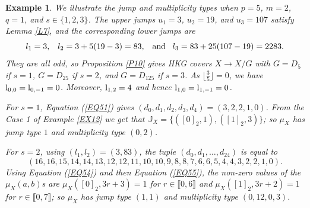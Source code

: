 \documentclass[11pt]{amsart}
\newtheorem{ex}[theorem]{Example}
\def\l{\textup{l}}
\begin{document}
\begin{ex}\normalfont\label{EX13}
We illustrate the jump and multiplicity types when $p=5$, $m=2$, $q=1$, and $s\in\{1,2,3\}$. The upper jumps
$u_1=3$, $u_2=19$, and $u_3=107$ satisfy Lemma \ref{L7}, and the corresponding lower jumps are
\[
l_1=3,\;\;\; l_2=3+5(19-3)=83,\;\;\;\textup{and}\;\;\;
l_3=83+25(107-19)=2283.
\]
They are all odd, so Proposition \ref{P10} gives HKG covers $X\rightarrow X/G$ with $G=D_5$ if $s=1$, $G=D_{25}$ if $s=2$, and $G=D_{125}$ if $s=3$. As $\lfloor\frac{3}{5}\rfloor=0$, we have $\l_{0,0}=\l_{0,-1}=0$. Moreover, $\l_{1,2}=4$ and hence $\l_{1,0}=\l_{1,-1}=0$.

For $s=1$, Equation (\ref{EQ51}) gives $(d_0,d_1,d_2,d_3,d_4)=(3,2,2,1,0)$. From the Case 1 of Example \ref{EX12} we get that $\mathbb J_X=\{([0]_2,1),([1]_2,3)\}$; so $\mu_X$ has jump type $1$ and multiplicity type $(0,2)$.

For $s=2$, using $(l_1,l_2)=(3,83)$, the tuple $(d_0,d_1,\ldots,d_{24})$ is equal to 
$$(16,16,15,14,14,13,12,12,11,10,10,9,8,8,7,6,6,5,4,4,3,2,2,1,0).$$
Using Equation (\ref{EQ54}) and then Equation (\ref{EQ55}), the non-zero
values of the $\mu_X(a,b)$s are $\mu_X([0]_2,3r+3)=1$ for $r\in\llbracket0,6\rrbracket$ and
$\mu_X([1]_2,3r+2)=1$ for $r\in\llbracket0,7\rrbracket$; so $\mu_X$ has jump type $(1,1)$ and multiplicity type $(0,12,0,3)$.


\end{ex}
\end{document}
